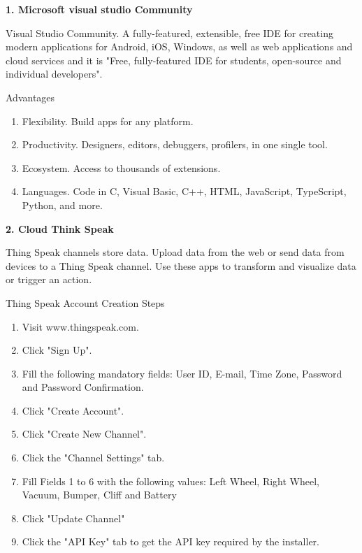 \documentclass[12pt,a4paper]{report}
\begin{document}
\noindent

\noindent

\noindent\textbf{1. Microsoft visual studio Community }


\noindent Visual Studio Community. A fully-featured, extensible, free IDE for creating modern applications for Android, iOS, Windows, as well as web applications and cloud services and it is "Free, fully-featured IDE for students, open-source and individual developers". 

\noindent 

\noindent Advantages 

\begin{enumerate}
\item  Flexibility. Build apps for any platform.

\item  Productivity. Designers, editors, debuggers, profilers, in one single tool.

\item  Ecosystem. Access to thousands of extensions.

\item  Languages. Code in C, Visual Basic, C++, HTML, JavaScript, TypeScript, Python, and more.
\end{enumerate}

\noindent 

\noindent 

\noindent\textbf{2. Cloud Think Speak}
\noindent

\noindent Thing Speak channels store data. Upload data from the web or send data from devices to a Thing Speak channel. Use these apps to transform and visualize data or trigger an action.

\noindent 

\noindent Thing Speak Account Creation Steps 

\begin{enumerate}
\item  Visit www.thingspeak.com.

\item  Click "Sign Up".

\item  Fill the following mandatory fields: User ID, E-mail, Time Zone, Password and Password Confirmation.

\item  Click "Create Account".

\item  Click "Create New Channel".

\item  Click the "Channel Settings" tab.

\item  Fill Fields 1 to 6 with the following values: Left Wheel, Right Wheel, Vacuum, Bumper, Cliff and Battery

\item  Click "Update Channel"

\item  Click the "API Key" tab to get the API key required by the installer. 
\end{enumerate}
\end{document}

